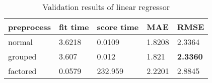 \begin{table}[H]
    \centering
    \begin{tabular}{l|llll}
    \toprule
    \textbf{preprocess} & \textbf{fit time} & \textbf{score time} & \textbf{MAE} & \textbf{RMSE} \\ \midrule
    normal  & 3.6218 & 0.0109  & 1.8208 & 2.3364          \\
    grouped & 3.607  & 0.012   & 1.821  & \textbf{2.3360} \\
    factored & 0.0579 & 232.959 & 2.2201 & 2.8845         \\
    \bottomrule       
    \end{tabular}
    \caption{Validation results of linear regressor}
    \label{tab:val_linear}
    \end{table}